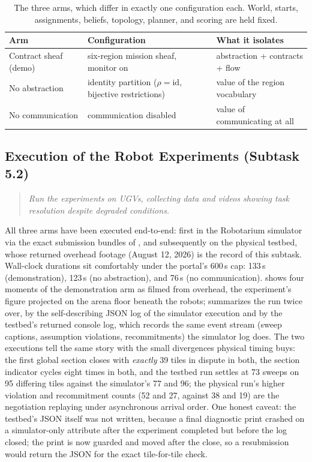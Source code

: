 \documentclass[10pt]{article}
\theoremstyle{definition}
\theoremstyle{remark}
\newcommand{\prompt}[1]{%
    \begin{quote}
        \centering\itshape #1
    \end{quote}%
}
\begin{document}
\begin{table}[h]
\centering
\small
\begin{tabular}{lll}
\toprule
\textbf{Arm} & \textbf{Configuration} & \textbf{What it isolates}\\
\midrule
Contract sheaf (demo) & six-region mission sheaf, monitor on & abstraction + contracts + flow\\
No abstraction & identity partition ($\rho = \mathrm{id}$, bijective restrictions) & value of the region vocabulary\\
No communication & communication disabled & value of communicating at all\\
\bottomrule
\end{tabular}
\caption{The three arms, which differ in exactly one configuration each. World, starts, assignments, beliefs, topology, planner, and scoring are held fixed.}
\label{tab:arms}
\end{table}

\subsection{Execution of the Robot Experiments (Subtask 5.2)}
\label{sec:task52}

\prompt{Run the experiments on UGVs, collecting data and videos showing task resolution despite degraded conditions.}

All three arms have been executed end-to-end: first in the Robotarium simulator via the exact submission bundles of , and subsequently on the physical testbed, whose returned overhead footage (August 12, 2026) is the record of this subtask. Wall-clock durations sit comfortably under the portal's 600\,s cap: 133\,s (demonstration), 123\,s (no abstraction), and 76\,s (no communication).  shows four moments of the demonstration arm as filmed from overhead, the experiment's figure projected on the arena floor beneath the robots;  summarizes the run twice over, by the self-describing JSON log of the simulator execution and by the testbed's returned console log, which records the same event stream (sweep captions, assumption violations, recommitments) the simulator log does. The two executions tell the same story with the small divergences physical timing buys: the first global section closes with \emph{exactly} 39 tiles in dispute in both, the section indicator cycles eight times in both, and the testbed run settles at 73 sweeps on 95 differing tiles against the simulator's 77 and 96; the physical run's higher violation and recommitment counts (52 and 27, against 38 and 19) are the negotiation replaying under asynchronous arrival order. One honest caveat: the testbed's JSON itself was not written, because a final diagnostic print crashed on a simulator-only attribute after the experiment completed but before the log closed; the print is now guarded and moved after the close, so a resubmission would return the JSON for the exact tile-for-tile check.
\end{document}
